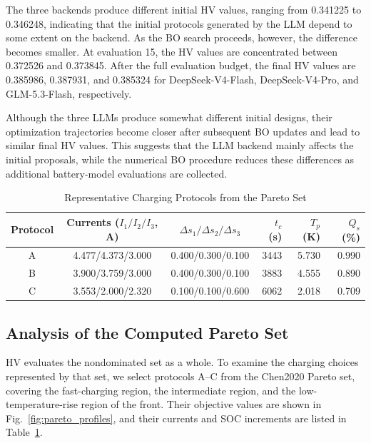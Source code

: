 \documentclass[journal,10pt]{IEEEtran}
\begin{document}
The three backends produce different initial HV values, ranging from
0.341225 to 0.346248, indicating that the initial protocols generated by
the LLM depend to some extent on the backend. As the BO search proceeds,
however, the difference becomes smaller. At evaluation 15, the HV values
are concentrated between 0.372526 and 0.373845. After the full evaluation
budget, the final HV values are 0.385986, 0.387931, and 0.385324 for
DeepSeek-V4-Flash, DeepSeek-V4-Pro, and GLM-5.3-Flash, respectively.

Although the three LLMs produce somewhat different initial designs, their
optimization trajectories become closer after subsequent BO updates and
lead to similar final HV values. This suggests that the LLM backend mainly
affects the initial proposals, while the numerical BO procedure reduces
these differences as additional battery-model evaluations are collected.

\begin{table}[!t]
\caption{Representative Charging Protocols from the Pareto Set}
\label{tab:representative_protocols}
\centering
\scriptsize
\setlength{\tabcolsep}{2.5pt}
\begin{tabular}{@{}c c c r r r@{}}
\toprule
Protocol & Currents ($I_1/I_2/I_3$, A) & $\Delta s_1/\Delta s_2/\Delta s_3$ &
$t_c$ (s) & $T_p$ (K) & $Q_s$ (\%) \\
\midrule
A & 4.477/4.373/3.000 & 0.400/0.300/0.100 & 3443 & 5.730 & 0.990 \\
B & 3.900/3.759/3.000 & 0.400/0.300/0.100 & 3883 & 4.555 & 0.890 \\
C & 3.553/2.000/2.320 & 0.100/0.100/0.600 & 6062 & 2.018 & 0.709 \\
\bottomrule
\end{tabular}
\end{table}

\subsection{Analysis of the Computed Pareto Set}

HV evaluates the nondominated set as a whole. To examine the charging choices
represented by that set, we select protocols A--C from the Chen2020 Pareto
set, covering the fast-charging region, the intermediate region, and the
low-temperature-rise region of the front. Their objective values are shown
in Fig.~\ref{fig:pareto_profiles}, and their currents and SOC increments are
listed in Table~\ref{tab:representative_protocols}.
\end{document}
